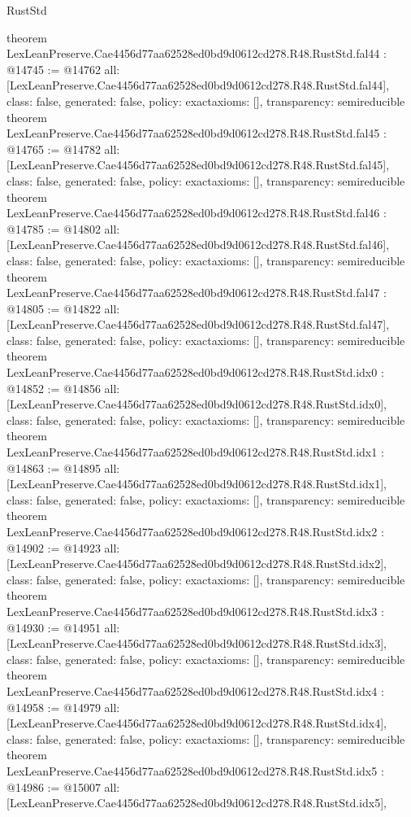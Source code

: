 \begin{lexlean}{RustStd}
\begin{coremodule}
{}
theorem LexLeanPreserve.Cae4456d77aa62528ed0bd9d0612cd278.R48.RustStd.fal44 : @14745 := @14762 {
  all: [LexLeanPreserve.Cae4456d77aa62528ed0bd9d0612cd278.R48.RustStd.fal44],
  class: false,
  generated: false,
  policy: exact{axioms: []},
  transparency: semireducible
}
theorem LexLeanPreserve.Cae4456d77aa62528ed0bd9d0612cd278.R48.RustStd.fal45 : @14765 := @14782 {
  all: [LexLeanPreserve.Cae4456d77aa62528ed0bd9d0612cd278.R48.RustStd.fal45],
  class: false,
  generated: false,
  policy: exact{axioms: []},
  transparency: semireducible
}
theorem LexLeanPreserve.Cae4456d77aa62528ed0bd9d0612cd278.R48.RustStd.fal46 : @14785 := @14802 {
  all: [LexLeanPreserve.Cae4456d77aa62528ed0bd9d0612cd278.R48.RustStd.fal46],
  class: false,
  generated: false,
  policy: exact{axioms: []},
  transparency: semireducible
}
theorem LexLeanPreserve.Cae4456d77aa62528ed0bd9d0612cd278.R48.RustStd.fal47 : @14805 := @14822 {
  all: [LexLeanPreserve.Cae4456d77aa62528ed0bd9d0612cd278.R48.RustStd.fal47],
  class: false,
  generated: false,
  policy: exact{axioms: []},
  transparency: semireducible
}
theorem LexLeanPreserve.Cae4456d77aa62528ed0bd9d0612cd278.R48.RustStd.idx0 : @14852 := @14856 {
  all: [LexLeanPreserve.Cae4456d77aa62528ed0bd9d0612cd278.R48.RustStd.idx0],
  class: false,
  generated: false,
  policy: exact{axioms: []},
  transparency: semireducible
}
theorem LexLeanPreserve.Cae4456d77aa62528ed0bd9d0612cd278.R48.RustStd.idx1 : @14863 := @14895 {
  all: [LexLeanPreserve.Cae4456d77aa62528ed0bd9d0612cd278.R48.RustStd.idx1],
  class: false,
  generated: false,
  policy: exact{axioms: []},
  transparency: semireducible
}
theorem LexLeanPreserve.Cae4456d77aa62528ed0bd9d0612cd278.R48.RustStd.idx2 : @14902 := @14923 {
  all: [LexLeanPreserve.Cae4456d77aa62528ed0bd9d0612cd278.R48.RustStd.idx2],
  class: false,
  generated: false,
  policy: exact{axioms: []},
  transparency: semireducible
}
theorem LexLeanPreserve.Cae4456d77aa62528ed0bd9d0612cd278.R48.RustStd.idx3 : @14930 := @14951 {
  all: [LexLeanPreserve.Cae4456d77aa62528ed0bd9d0612cd278.R48.RustStd.idx3],
  class: false,
  generated: false,
  policy: exact{axioms: []},
  transparency: semireducible
}
theorem LexLeanPreserve.Cae4456d77aa62528ed0bd9d0612cd278.R48.RustStd.idx4 : @14958 := @14979 {
  all: [LexLeanPreserve.Cae4456d77aa62528ed0bd9d0612cd278.R48.RustStd.idx4],
  class: false,
  generated: false,
  policy: exact{axioms: []},
  transparency: semireducible
}
theorem LexLeanPreserve.Cae4456d77aa62528ed0bd9d0612cd278.R48.RustStd.idx5 : @14986 := @15007 {
  all: [LexLeanPreserve.Cae4456d77aa62528ed0bd9d0612cd278.R48.RustStd.idx5],
}
\end{coremodule}
\end{lexlean}
